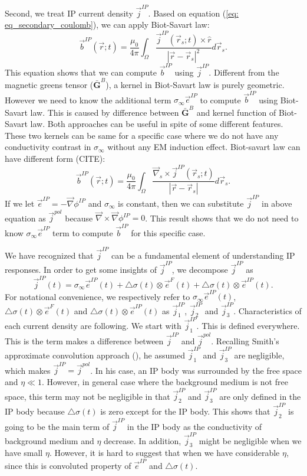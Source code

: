 \documentclass[a4paper, 11pt]{article}
\newcommand{\grad}{\vec \nabla}
\newcommand{\curl}{{\vec \nabla}\times}
\newcommand{\siginf}{\sigma_\infty}
\newcommand{\dsig}{\triangle\sigma}
\renewcommand {\j}  { {\vec j} }
\renewcommand {\b}  { {\vec b} }
\newcommand {\e}  { {\vec e} }
\begin{document}
Second, we treat IP current density $\j^{IP}$. Based on equation (\ref{eq: eq_secondary_coulomb}), we can apply Biot-Savart law:
\begin{equation}
  \b^{IP}(\vec{r}; t) = \frac{\mu_0}{4\pi}\int_{\Omega}  \frac{\j^{IP}(\vec{r}_s; t)\times\hat{r}}{|\vec{r}-\vec{r}_s|^2}d\vec{r}_s. 
\end{equation}
This equation shows that  we can compute $\b^{IP}$ using $\j^{IP}$. Different from the magnetic greens tensor ($\bar{\mathbf{G}}^B$), a kernel in Biot-Savart law is purely geometric. However we need to know the additional term $\siginf\e^{IP}$ to compute $\b^{IP}$ using Biot-Savart law. This is caused by difference between $\bar{\mathbf{G}}^B$ and kernel function of Biot-Savart law. Both approaches can be useful in spite of some different features. These two kernels can be same for a specific case where we do not have any conductivity contrast in $\siginf$ without any EM induction effect. Biot-savart law can have different form (CITE):
\begin{equation}
  \b^{IP}(\vec{r}; t) = \frac{\mu_0}{4\pi}\int_{\Omega}  \frac{\vec{\nabla}_s \times \j^{IP}(\vec{r}_s; t)}{|\vec{r}-\vec{r}_s|}d\vec{r}_s.
  \label{eq: Biot}
\end{equation}
If we let $\e^{IP} = -\grad\phi^{IP}$ and $\siginf$ is constant, then we can substitute $\j^{IP}$ in above equation as $\j^{pol}$ because $\curl \grad \phi^{IP} = 0$. This result shows that we do not need to know $\siginf \e^{IP}$ term to compute $\b^{IP}$ for this specific case. 

We have recognized that $\j^{IP}$ can be a fundamental element of understanding IP responses. In order to get some insights of $\j^{IP}$, we decompose $\j^{IP}$ as
\begin{equation}
    \j^{IP}(t) = \siginf\e^{IP}(t) + \dsig(t)\otimes\e^{F}(t)+ \dsig(t)\otimes\e^{IP}(t).
    \label{eq: jip_three}
\end{equation}
For notational convenience, we respectively refer to $\siginf\e^{IP}(t)$, $\dsig(t)\otimes\e^{F}(t)$ and $\dsig(t)\otimes\e^{IP}(t)$ as $\j^{IP}_1$, $\j^{IP}_2$ and $\j^{IP}_3$. Characteristics of each current density are following. We start with $\j^{IP}_1$. This is defined everywhere. This is the term makes a difference between $\j^{IP}$ and $\j^{pol}$. Recalling Smith’s approximate convolution approach (\cite{Smith1988a}), he assumed $\j^{IP}_1$ and $\j^{IP}_3$ are negligible, which makes $\j^{IP} = \j^{pol}$. In his case, an IP body was surrounded by the free space and $\eta \ll 1$.  However, in general case where the background medium is not free space, this term may not be negligible in that $\j^{IP}_2$ and $\j^{IP}_3$ are only defined in the IP body because $\dsig(t)$ is zero except for the IP body. This shows that $\j^{IP}_2$ is going to be the main term of $\j^{IP}$ in the IP body as the conductivity of background medium and $\eta$ decrease. In addition, $\j^{IP}_3$ might be negligible when we have small $\eta$. However, it is hard to suggest that when we have considerable $\eta$, since this is convoluted property of $\e^{IP}$ and $\dsig(t)$.
\end{document}
